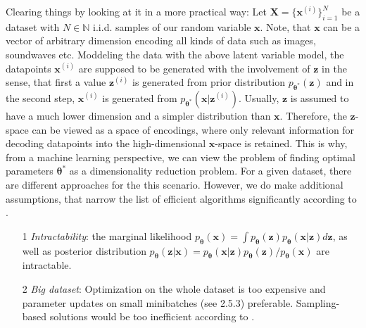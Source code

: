 \documentclass[12pt]{report}
\theoremstyle{definition}
\begin{document}
Clearing things by looking at it in a more practical way: Let $\mathbf{X} = \{ \mathbf{x}^{(i)}\}_{i=1}^N$ be a dataset with $N \in \mathbb{N}$ i.i.d. samples of our random variable $\mathbf{x}$. Note, that $\mathbf{x}$ can be a vector of arbitrary dimension encoding all kinds of data such as images, soundwaves etc. Moddeling the data with the above latent variable model, the datapoints $\mathbf{x}^{(i)}$ are supposed to be generated with the involvement of $\mathbf{z}$ in the sense, that first a value $\mathbf{z}^{(i)}$ is generated from prior distribution $p_{\mathbf{\theta^*}}(\mathbf{z})$ and in the second step, $\mathbf{x}^{(i)}$ is generated from $p_{\pmb{\theta}^*}(\mathbf{x}|\mathbf{z}^{(i)})$.
Usually, $\mathbf{z}$ is assumed to have a much lower dimension and a simpler distribution than $\mathbf{x}$. Therefore, the $\mathbf{z}$-space can be viewed as a space of encodings, where only relevant information for decoding datapoints into the high-dimensional $\mathbf{x}$-space is retained. This is why, from a machine learning perspective, we can view the problem of finding optimal parameters $\pmb{\theta}^*$ as a dimensionality reduction problem.
For a given dataset, there are different approaches for the this scenario. However, we do make additional assumptions, that narrow the list of efficient algorithms significantly according to \cite{kingma1}.

\begin{itemize}
	\item[1] \emph{Intractability}: the marginal likelihood $p_{\pmb{\theta}}(\mathbf{x}) = \int p_{\pmb{\theta}}(\mathbf{z}) p_{\pmb{\theta}}(\mathbf{x}|\mathbf{z}) d \mathbf{z}$, as well as posterior distribution $p_{\pmb{\theta}}(\mathbf{z}|\mathbf{x}) = p_{\pmb{\theta}}(\mathbf{x}|\mathbf{z}) p_{\pmb{\theta}}(\mathbf{z}) / p_{\pmb{\theta}}(\mathbf{x})$ are intractable.
	\item[2] \emph{Big dataset}: Optimization on the whole dataset is too expensive and parameter updates on small minibatches (see 2.5.3) preferable. Sampling-based solutions would be too inefficient according to \cite{kingma1}.
\end{itemize}
\end{document}
